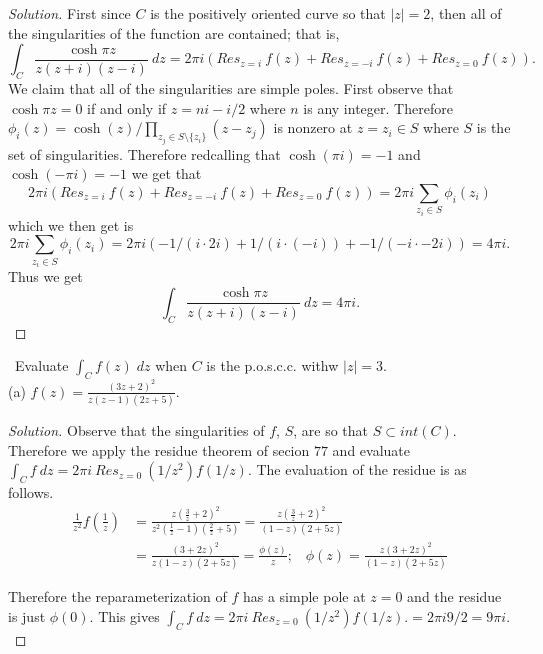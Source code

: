 \documentclass[11pt]{amsart}
\theoremstyle{definition}
\numberwithin{theorem}{section}
\numberwithin{definition}{section}
\numberwithin{equation}{section}
\newenvironment{solution}
  {\begin{proof}[Solution]}
  {\end{proof}}
\newcommand{\parens}[1]{ \left( #1 \right) }
\begin{document}
\begin{solution}
	First since $C$ is the positively oriented curve so that $|z| = 2$, then all of the singularities of the function are contained; that is,
	\begin{equation*}
	\int_C \frac{\cosh \pi z}{z(z+i)(z-i)}\ dz = 2\pi i(Res_{z=i}\ f(z) + Res_{z=-i}\ f(z) + Res_{z=0}\ f(z)).
	\end{equation*}
	We claim that all of the singularities are simple poles. First observe that $\cosh \pi z = 0$ if and only if $z = ni - i/2$ where $n$ is any integer. Therefore $\phi_i(z)=\cosh(z)/\prod_{z_j \in S \setminus\{z_i\}}(z-z_j)$ is nonzero at $z = z_i \in S$ where $S$ is the set of singularities. Therefore redcalling that $\cosh (\pi i )= -1$ and $\cosh (-\pi i) = -1$ we get that 
	\begin{equation*}
		2\pi i(Res_{z=i}\ f(z) + Res_{z=-i}\ f(z) + Res_{z=0}\ f(z)) = 2\pi i \sum_{z_i \in S} \phi_i(z_i) 
	\end{equation*}
	which we then get is
	\begin{equation*}
		2\pi i \sum_{z_i \in S} \phi_i(z_i) = 2\pi i(-1/(i\cdot 2i) + 1/(i\cdot(-i)) + -1/(-i\cdot -2i) ) = 4\pi i.
	\end{equation*}
	Thus we get
	\begin{equation*}
		\int_C \frac{\cosh \pi z}{z(z+i)(z-i)}\ dz  =  4\pi i.
	\end{equation*}
\end{solution}
\medskip {}\ Evaluate $\int_C f(z)\; dz$ when $C$ is the p.o.s.c.c. withw $|z| =3$. \\
(a) $f(z) = \frac{(3z+2)^2}{z(z-1)(2z+5)}.$
\begin{solution}
	Observe that the singularities of $f$, $S$, are so that $S \subset int(C).$ Therefore we apply the residue theorem of secion $77$ and evaluate $\int_C f\ dz = 2\pi i \ Res_{z=0}\ (1/z^2)f(1/z).$ The evaluation of the residue is as follows.
	\begin{equation*}
	\begin{aligned}
		\frac{1}{z^2}f\left(\frac{1}{z}\right) &= \frac{z\left(\frac{3}{z}+2\right)^2}{z^2 \parens{\frac{1}{z} - 1}\parens{\frac{2}{z} + 5}} = \frac{z \parens{ \frac{3}{z} + 2}^2}{\parens{1-z}\parens{2+5z}}\\
		&= \frac{ \parens{ {3} + 2z}^2}{z\parens{1-z}\parens{2+5z}} = \frac{\phi(z)}{z};\;\;\; \phi(z) = \frac{z \parens{ {3} + 2z}^2}{\parens{1-z}\parens{2+5z}} 
	\end{aligned}
	\end{equation*}

	Therefore the reparameterization of $f$ has a simple pole at $z = 0$ and the residue is just $\phi(0).$ This gives
	$\int_C f\ dz = 2\pi i \ Res_{z=0}\ (1/z^2)f(1/z). = 2\pi i 9/2 = 9\pi i.$
\end{solution}
\end{document}
